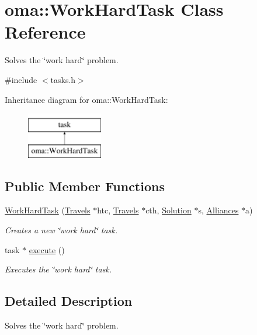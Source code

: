 \hypertarget{classoma_1_1_work_hard_task}{\section{oma\-:\-:Work\-Hard\-Task Class Reference}
\label{classoma_1_1_work_hard_task}
}


Solves the \char`\"{}work hard\char`\"{} problem.  




{\ttfamily \#include $<$tasks.\-h$>$}

Inheritance diagram for oma\-:\-:Work\-Hard\-Task\-:\begin{figure}[H]
\begin{center}
\leavevmode
\includegraphics[height=2.000000cm]{classoma_1_1_work_hard_task}
\end{center}
\end{figure}
\subsection*{Public Member Functions}
\begin{DoxyCompactItemize}
\item 
\hyperlink{classoma_1_1_work_hard_task_a3218415965120cba77c3f22ef74aa403}{Work\-Hard\-Task} (\hyperlink{types_8h_aef021ba284c03a12dddcfa082468e831}{Travels} $\ast$htc, \hyperlink{types_8h_aef021ba284c03a12dddcfa082468e831}{Travels} $\ast$cth, \hyperlink{class_solution}{Solution} $\ast$s, \hyperlink{types_8h_a942cbcc40778424afe78605ae5c364c0}{Alliances} $\ast$a)
\begin{DoxyCompactList}\small\item\em Creates a new \char`\"{}work hard\char`\"{} task. \end{DoxyCompactList}\item 
task $\ast$ \hyperlink{classoma_1_1_work_hard_task_a4e325df674e8ec83ceb1533846143a3b}{execute} ()
\begin{DoxyCompactList}\small\item\em Executes the \char`\"{}work hard\char`\"{} task. \end{DoxyCompactList}\end{DoxyCompactItemize}


\subsection{Detailed Description}
Solves the \char`\"{}work hard\char`\"{} problem. 

